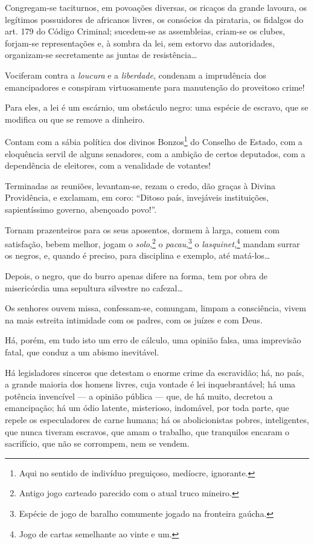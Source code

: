 Congregam-se taciturnos, em povoações diversas, os ricaços da grande
lavoura, os legítimos possuidores de africanos livres, os consócios da
pirataria, os fidalgos do art. 179 do Código Criminal; sucedem-se as
assembleias, criam-se os clubes, forjam-se representações e, à sombra da
lei, sem estorvo das autoridades, organizam-se secretamente as juntas de
resistência\ldots{}

Vociferam contra a \emph{loucura} e a \emph{liberdade}, condenam a
imprudência dos emancipadores e conspiram virtuosamente para manutenção
do proveitoso crime!

Para eles, a lei é um escárnio, um obstáculo negro: uma espécie de
escravo, que se modifica ou que se remove a dinheiro.

Contam com a sábia política dos divinos Bonzos\footnote{Aqui no
  sentido de indivíduo preguiçoso, medíocre, ignorante.} do Conselho de
Estado, com a eloquência servil de alguns senadores, com a ambição de
certos deputados, com a dependência de eleitores, com a venalidade de
votantes!

Terminadas as reuniões, levantam-se, rezam o credo, dão graças à Divina
Providência, e exclamam, em coro: ``Ditoso país, invejáveis instituições,
sapientíssimo governo, abençoado povo!''.

Tornam prazenteiros para os seus aposentos, dormem à larga, comem com
satisfação, bebem melhor, jogam o \emph{solo},\footnote{Antigo jogo
  carteado parecido com o atual truco mineiro.} o
\emph{pacau},\footnote{Espécie de jogo de baralho comumente jogado na
  fronteira gaúcha.} o \emph{lasquinet},\footnote{Jogo de cartas
  semelhante ao vinte e um.} mandam surrar os negros, e,
quando é preciso, para disciplina e exemplo, até matá-los\ldots{}

Depois, o negro, que do burro apenas difere na forma, tem por obra de
misericórdia uma sepultura silvestre no cafezal\ldots{}

Os senhores ouvem missa, confessam-se, comungam, limpam a consciência,
vivem na mais estreita intimidade com os padres, com os juízes e com
Deus.

Há, porém, em tudo isto um erro de cálculo, uma opinião falsa, uma
imprevisão fatal, que conduz a um abismo inevitável.

Há legisladores sinceros que detestam o enorme crime da escravidão; há,
no país, a grande maioria dos homens livres, cuja vontade é lei
inquebrantável; há uma potência invencível --- a opinião pública ---
que, de há muito, decretou a emancipação; há um ódio latente,
misterioso, indomável, por toda parte, que repele os especuladores de
carne humana; há os abolicionistas pobres, inteligentes, que nunca
tiveram escravos, que amam o trabalho, que tranquilos encaram o
sacrifício, que não se corrompem, nem se vendem.

